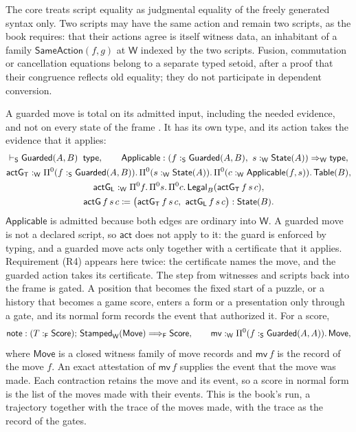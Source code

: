 \documentclass[11pt]{article}
\numberwithin{equation}{section}
\theoremstyle{definition}
\theoremstyle{plain}
\theoremstyle{remark}
\newcommand{\Type}{\mathsf{type}}
\newcommand{\State}{\AFState}
\newcommand{\Stamped}{\mathsf{Stamped}}
\newcommand{\Frm}{\mathsf F}
\newcommand{\Wit}{\mathsf W}
\newcommand{\Scr}{\mathsf S}
\newcommand{\jtype}{\mathrel{\mathsf{type}}}
\begin{document}
The core treats script equality as judgmental equality of the freely generated
syntax only.  Two scripts may have the same action and remain two scripts, as
the book requires: that their actions agree is itself witness data, an
inhabitant of a family
\(
 \mathsf{SameAction}(f,g)
\)
at \(\Wit\) indexed by the two scripts.  Fusion, commutation or cancellation
equations belong to a separate typed setoid, after a proof that their
congruence reflects old equality; they do not participate in dependent
conversion.

A guarded move is total on its admitted input, including the needed
evidence, and not on every state of the frame \cite[\S1.9]{Book}.  It has its
own type, and its action takes the evidence that it applies:
\[
\begin{gathered}
 \vdash_{\Scr}\mathsf{Guarded}(A,B)\;\jtype,
 \qquad
 \mathsf{Applicable}:(f:_{\Scr}\mathsf{Guarded}(A,B),\ s:_{\Wit}\State(A))
 \Rightarrow_{\Wit}\Type,\\
 \mathsf{actG}_{\mathsf T}:_{\Wit}
 \AFDepFun^0(f:_{\Scr}\mathsf{Guarded}(A,B)).\,
 \AFDepFun^0(s:_{\Wit}\State(A)).\,
 \AFDepFun^0(c:_{\Wit}\mathsf{Applicable}(f,s)).\,\mathsf{Table}(B),\\
 \mathsf{actG}_{\mathsf L}:_{\Wit}
 \AFDepFun^0 f.\,\AFDepFun^0 s.\,\AFDepFun^0 c.\,
 \mathsf{Legal}_B(\mathsf{actG}_{\mathsf T}\,f\,s\,c),\\
 \mathsf{actG}\,f\,s\,c\coloneqq
 \bigl(\mathsf{actG}_{\mathsf T}\,f\,s\,c,\
 \mathsf{actG}_{\mathsf L}\,f\,s\,c\bigr):\State(B).
\end{gathered}
\]
\(\mathsf{Applicable}\) is admitted because both edges are ordinary into
\(\Wit\).  A guarded move is not a declared script, so \(\mathsf{act}\) does
not apply to it: the guard is enforced by typing, and a guarded move acts
only together with a certificate that it applies.  Requirement (R4) appears
here twice: the certificate names the move, and the guarded action takes its
certificate.  The step from witnesses and scripts back into the frame is
gated.  A position that becomes the fixed start of a puzzle, or a
history that becomes a game score, enters a form or a presentation only
through a gate, and its normal form records the event that authorized it.  For
a score,
\[
 \mathsf{note}:
 (T:_{\Frm}\mathsf{Score});\,
 \Stamped_\Wit(\mathsf{Move})
 \Longrightarrow_{\Frm}\mathsf{Score},
 \qquad
 \mathsf{mv}:_{\Wit}\AFDepFun^0(f:_{\Scr}\mathsf{Guarded}(A,A)).\,\mathsf{Move},
\]
where \(\mathsf{Move}\) is a closed witness family of move records and
\(\mathsf{mv}\,f\) is the record of the move \(f\).  An exact attestation of
\(\mathsf{mv}\,f\) supplies the event that the move was made.  Each
contraction retains the move and its event, so a score in normal form is the
list of the moves made with their events.  This is the book's run, a
trajectory together with the trace of the moves made, with the trace as the
record of the gates.
\end{document}
